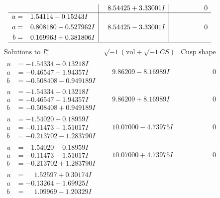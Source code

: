 \documentclass[1p]{elsarticle_modified}
\theoremstyle{definition}
\newcommand{\I}{\sqrt{-1}}
\begin{document}
$$\begin{array}{c|c|c}
 & \phantom{-}8.54425 + 3.33001 I & \phantom{-0.000000 } 0 \\ \hline\begin{aligned}
u &= \phantom{-}1.54114 - 0.15243 I \\
a &= \phantom{-}0.808180 - 0.527962 I \\
b &= \phantom{-}0.169963 + 0.381806 I\end{aligned}
 & \phantom{-}8.54425 - 3.33001 I & \phantom{-0.000000 } 0\\
 \hline 
 \end{array}$$\newpage$$\begin{array}{c|c|c}  
\text{Solutions to }I^u_{1}& \I (\text{vol} + \sqrt{-1}CS) & \text{Cusp shape}\\
 \hline 
\begin{aligned}
u &= -1.54334 + 0.13218 I \\
a &= -0.46547 + 1.94357 I \\
b &= -0.508408 - 0.949189 I\end{aligned}
 & \phantom{-}9.86209 - 8.16989 I & \phantom{-0.000000 } 0 \\ \hline\begin{aligned}
u &= -1.54334 - 0.13218 I \\
a &= -0.46547 - 1.94357 I \\
b &= -0.508408 + 0.949189 I\end{aligned}
 & \phantom{-}9.86209 + 8.16989 I & \phantom{-0.000000 } 0 \\ \hline\begin{aligned}
u &= -1.54020 + 0.18959 I \\
a &= -0.11473 + 1.51017 I \\
b &= -0.213702 - 1.283790 I\end{aligned}
 & \phantom{-}10.07000 - 4.73975 I & \phantom{-0.000000 } 0 \\ \hline\begin{aligned}
u &= -1.54020 - 0.18959 I \\
a &= -0.11473 - 1.51017 I \\
b &= -0.213702 + 1.283790 I\end{aligned}
 & \phantom{-}10.07000 + 4.73975 I & \phantom{-0.000000 } 0 \\ \hline\begin{aligned}
u &= \phantom{-}1.52597 + 0.30174 I \\
a &= -0.13264 + 1.69925 I \\
b &= \phantom{-}1.09969 - 1.20329 I\end{aligned}

\end{array}$$
\end{document}
